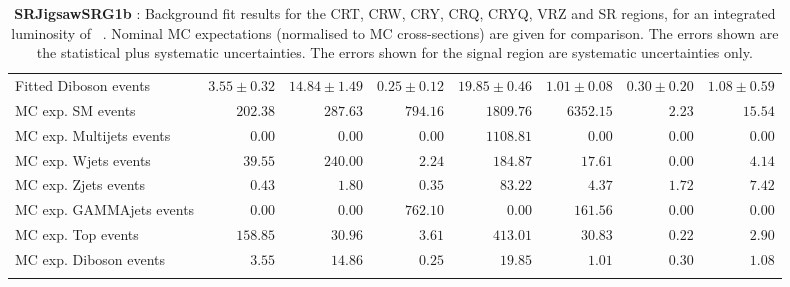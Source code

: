 \begin{table}
\begin{center}
{\begin{tabular*}{\textwidth}{@{\extracolsep{\fill}}lrrrrrrr}
        Fitted Diboson events         & $3.55 \pm 0.32$          & $14.84 \pm 1.49$          & $0.25 \pm 0.12$          & $19.85 \pm 0.46$          & $1.01 \pm 0.08$          & $0.30 \pm 0.20$          & $1.08 \pm 0.59$              \\
 \noalign{\smallskip}\hline\noalign{\smallskip}
MC exp. SM events              & $202.38$          & $287.63$          & $794.16$          & $1809.76$          & $6352.15$          & $2.23$          & $15.54$              \\
\noalign{\smallskip}\hline\noalign{\smallskip}
        MC exp. Multijets events         & $0.00$          & $0.00$          & $0.00$          & $1108.81$          & $0.00$          & $0.00$          & $0.00$              \\
        MC exp. Wjets events         & $39.55$          & $240.00$          & $2.24$          & $184.87$          & $17.61$          & $0.00$          & $4.14$              \\
        MC exp. Zjets events         & $0.43$          & $1.80$          & $0.35$          & $83.22$          & $4.37$          & $1.72$          & $7.42$              \\
        MC exp. GAMMAjets events         & $0.00$          & $0.00$          & $762.10$          & $0.00$          & $161.56$          & $0.00$          & $0.00$              \\
        MC exp. Top events         & $158.85$          & $30.96$          & $3.61$          & $413.01$          & $30.83$          & $0.22$          & $2.90$              \\
        MC exp. Diboson events         & $3.55$          & $14.86$          & $0.25$          & $19.85$          & $1.01$          & $0.30$          & $1.08$              \\
\noalign{\smallskip}\hline\noalign{\smallskip}
\end{tabular*}
}
\end{center}
\caption{{\bf SRJigsawSRG1b} : Background fit results for the CRT, CRW, CRY, CRQ, CRYQ, VRZ and SR regions, for an integrated luminosity of \ourintlumi~\ifb. Nominal MC expectations (normalised to MC cross-sections) are given for comparison. The errors shown are the statistical plus systematic uncertainties. The errors shown for the signal region are systematic uncertainties only.}
\label{table.results.systematics.in.logL.fit.CRT.CRW.CRY.CRQ.CRYQ.VRZ.SR.SRJigsawSRG1b}
\end{table}
%